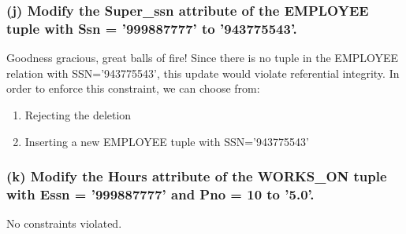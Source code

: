 \subsubsection*{(j) Modify the Super\_ssn attribute of the EMPLOYEE tuple with Ssn = '999887777' to '943775543'.}
Goodness gracious, great balls of fire! Since there is no tuple in the EMPLOYEE relation with SSN='943775543', this update would violate referential integrity. In order to enforce this constraint, we can choose from:
\begin{enumerate}
\item Rejecting the deletion
\item Inserting a new EMPLOYEE tuple with SSN='943775543'
\end{enumerate}

\subsubsection*{(k) Modify the Hours attribute of the WORKS\_ON tuple with Essn = '999887777' and Pno = 10 to '5.0'.}
No constraints violated.